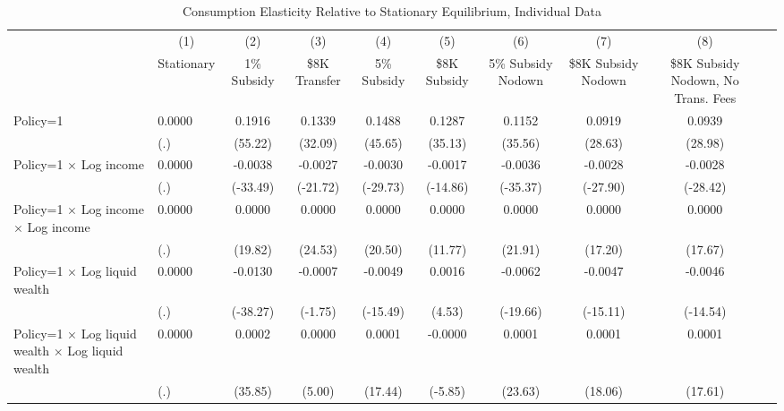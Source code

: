 \begin{table}[h!tbp]\centering
\footnotesize
\caption{Consumption Elasticity Relative to Stationary Equilibrium, Individual Data}
\begin{tabular}{p{1.2in}l*{8}{c}}
\hline\hline
                    &\multicolumn{1}{c}{(1)}&\multicolumn{1}{c}{(2)}&\multicolumn{1}{c}{(3)}&\multicolumn{1}{c}{(4)}&\multicolumn{1}{c}{(5)}&\multicolumn{1}{c}{(6)}&\multicolumn{1}{c}{(7)}&\multicolumn{1}{c}{(8)}\\
                    &\multicolumn{1}{c}{Stationary}&\multicolumn{1}{c}{1\% Subsidy}&\multicolumn{1}{c}{\$8K Transfer}&\multicolumn{1}{c}{5\% Subsidy}&\multicolumn{1}{c}{\$8K Subsidy}&\multicolumn{1}{c}{5\% Subsidy Nodown}&\multicolumn{1}{c}{\$8K Subsidy Nodown}&\multicolumn{1}{c}{\$8K Subsidy Nodown, No Trans. Fees}\\
\midrule
Policy=1             &      0.0000&      0.1916&      0.1339&      0.1488&      0.1287&      0.1152&      0.0919&      0.0939\\
                    &         (.)&     (55.22)&     (32.09)&     (45.65)&     (35.13)&     (35.56)&     (28.63)&     (28.98)\\
Policy=1 $\times$ Log income&      0.0000&     -0.0038&     -0.0027&     -0.0030&     -0.0017&     -0.0036&     -0.0028&     -0.0028\\
                    &         (.)&    (-33.49)&    (-21.72)&    (-29.73)&    (-14.86)&    (-35.37)&    (-27.90)&    (-28.42)\\
[1em]
Policy=1 $\times$ Log income $\times$ Log income&      0.0000&      0.0000&      0.0000&      0.0000&      0.0000&      0.0000&      0.0000&      0.0000\\
                    &         (.)&     (19.82)&     (24.53)&     (20.50)&     (11.77)&     (21.91)&     (17.20)&     (17.67)\\
[1em]
Policy=1 $\times$ Log liquid wealth&      0.0000&     -0.0130&     -0.0007&     -0.0049&      0.0016&     -0.0062&     -0.0047&     -0.0046\\
                    &         (.)&    (-38.27)&     (-1.75)&    (-15.49)&      (4.53)&    (-19.66)&    (-15.11)&    (-14.54)\\
[1em]
Policy=1 $\times$ Log liquid wealth $\times$ Log liquid wealth&      0.0000&      0.0002&      0.0000&      0.0001&     -0.0000&      0.0001&      0.0001&      0.0001\\
                    &         (.)&     (35.85)&      (5.00)&     (17.44)&     (-5.85)&     (23.63)&     (18.06)&     (17.61)\\

\end{tabular}
\end{table}

